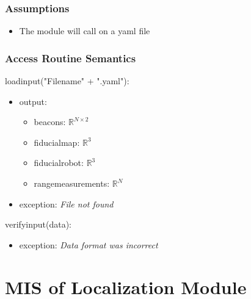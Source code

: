 \documentclass[12pt, titlepage]{article}
\begin{document}
\subsubsection{Assumptions}
\begin{itemize}
  \item The module will call on a yaml file
\end{itemize}

\subsubsection{Access Routine Semantics}

\noindent load\textunderscore input("Filename" + ".yaml"):
\begin{itemize}
\item output:
\begin{itemize}
  \item beacons: $\mathbb{R}^{N \times 2}$
  \item fiducial\textunderscore map: $\mathbb{R}^3$
  \item fiducial\textunderscore robot: $\mathbb{R}^3$
  \item range\textunderscore measurements: $\mathbb{R}^N$
\end{itemize}
\item exception: \textit{File not found}
\end{itemize}

\noindent verify\textunderscore input(data):
\begin{itemize}
\item exception: \textit{Data format was incorrect}
\end{itemize}



\newpage

\section{MIS of Localization Module} \label{M_Localize}
\end{document}
